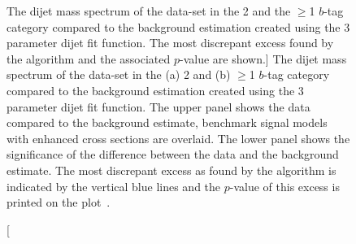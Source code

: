 \begin{figure}[!htb]
  \begin{center}
    \captionsetup[subfigure]{aboveskip=0pt,justification=centering}
  \end{center}
  \vspace{-1em}
  \caption
      [The dijet mass spectrum of the \summer{} data-set in the 2 and the $\geq$1 $b$-tag category
        compared to the background estimation created using the 3 parameter dijet fit function.
        The most discrepant excess found by the \bh{} algorithm and the associated \mbox{$p$-value} are shown.]        
      {The dijet mass spectrum of the  \summer{} data-set in the (a) 2 and (b) $\geq$1 $b$-tag category
        compared to the background estimation created using the 3 parameter dijet fit function.
        The upper panel shows the data compared to the background estimate,
        benchmark signal models with enhanced cross sections are overlaid.
        The lower panel shows the significance of the difference between the data and the background estimate.
        The most discrepant excess as found by the \bh{} algorithm is indicated by the vertical blue lines and the \mbox{$p$-value} of this excess is printed on the plot~\cite{dibjet-ichep_conf}.
          }
  \label{fig:bkg-summer_searchPhase}
\end{figure}

